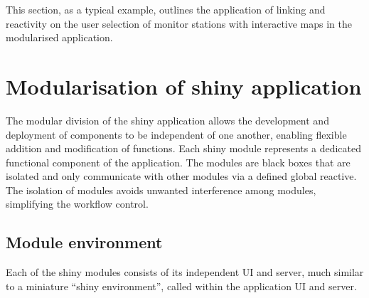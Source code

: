 \documentclass{aucklandthesis}
\begin{document}
This section, as a typical example, outlines the application of linking and reactivity on the user selection of monitor stations with interactive maps in the modularised application.

\hypertarget{modularisation-of-shiny-application}{%
\section{Modularisation of shiny application}\label{modularisation-of-shiny-application}}

The modular division of the shiny application allows the development and deployment of components to be independent of one another, enabling flexible addition and modification of functions. Each shiny module represents a dedicated functional component of the application. The modules are black boxes that are isolated and only communicate with other modules via a defined global reactive. The isolation of modules avoids unwanted interference among modules, simplifying the workflow control.

\hypertarget{module-environment}{%
\subsection{Module environment}\label{module-environment}}

Each of the shiny modules consists of its independent UI and server, much similar to a miniature ``shiny environment'', called within the application UI and server.

\begin{Shaded}
\begin{Highlighting}[]
\StringTok{ }
\StringTok{ }
  \NormalTok{(}\NormalTok{(}\NormalTok{(}\NormalTok{), } \NormalTok{))}
\NormalTok{\}}

\StringTok{ }
\StringTok{ }
\NormalTok{    output[[}\NormalTok{]] <-}\StringTok{ }
\NormalTok{  \}}
\NormalTok{\}}
\end{Highlighting}
\end{Shaded}
\end{document}
